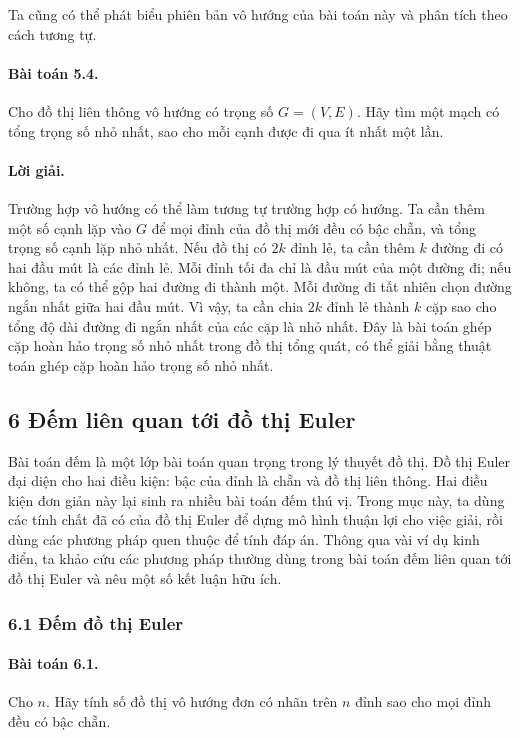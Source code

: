 \documentclass[11pt]{article}
\begin{document}
Ta cũng có thể phát biểu phiên bản vô hướng của bài toán này và phân tích theo
cách tương tự.

\paragraph{Bài toán 5.4.}
Cho đồ thị liên thông vô hướng có trọng số \(G=(V,E)\). Hãy tìm một mạch có
tổng trọng số nhỏ nhất, sao cho mỗi cạnh được đi qua ít nhất một lần.

\paragraph{Lời giải.}
Trường hợp vô hướng có thể làm tương tự trường hợp có hướng. Ta cần thêm một số
cạnh lặp vào \(G\) để mọi đỉnh của đồ thị mới đều có bậc chẵn, và tổng trọng số
cạnh lặp nhỏ nhất. Nếu đồ thị có \(2k\) đỉnh lẻ, ta cần thêm \(k\) đường đi có
hai đầu mút là các đỉnh lẻ. Mỗi đỉnh tối đa chỉ là đầu mút của một đường đi;
nếu không, ta có thể gộp hai đường đi thành một. Mỗi đường đi tất nhiên chọn
đường ngắn nhất giữa hai đầu mút. Vì vậy, ta cần chia \(2k\) đỉnh lẻ thành
\(k\) cặp sao cho tổng độ dài đường đi ngắn nhất của các cặp là nhỏ nhất. Đây
là bài toán ghép cặp hoàn hảo trọng số nhỏ nhất trong đồ thị tổng quát, có thể
giải bằng thuật toán ghép cặp hoàn hảo trọng số nhỏ nhất.

\subsection*{6 Đếm liên quan tới đồ thị Euler}

Bài toán đếm là một lớp bài toán quan trọng trong lý thuyết đồ thị. Đồ thị
Euler đại diện cho hai điều kiện: bậc của đỉnh là chẵn và đồ thị liên thông.
Hai điều kiện đơn giản này lại sinh ra nhiều bài toán đếm thú vị. Trong mục
này, ta dùng các tính chất đã có của đồ thị Euler để dựng mô hình thuận lợi cho
việc giải, rồi dùng các phương pháp quen thuộc để tính đáp án. Thông qua vài ví
dụ kinh điển, ta khảo cứu các phương pháp thường dùng trong bài toán đếm liên
quan tới đồ thị Euler và nêu một số kết luận hữu ích.

\subsubsection*{6.1 Đếm đồ thị Euler}

\paragraph{Bài toán 6.1.}
Cho \(n\). Hãy tính số đồ thị vô hướng đơn có nhãn trên \(n\) đỉnh sao cho mọi
đỉnh đều có bậc chẵn.
\end{document}
